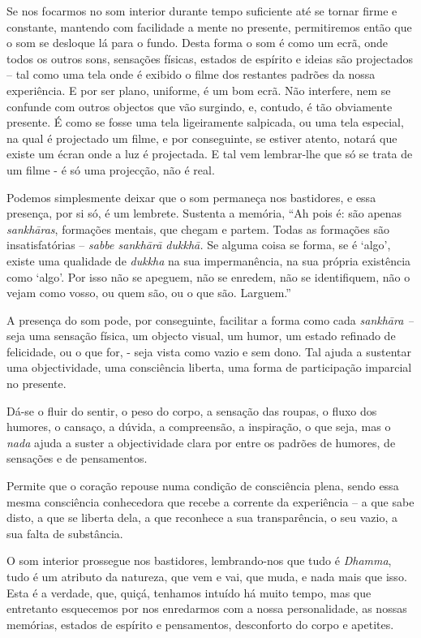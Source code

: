 Se nos focarmos no som interior durante tempo suficiente até se tornar
firme e constante, mantendo com facilidade a mente no presente,
permitiremos então que o som se desloque lá para o fundo. Desta forma o
som é como um ecrã, onde todos os outros sons, sensações físicas,
estados de espírito e ideias são projectados -- tal como uma tela onde é
exibido o filme dos restantes padrões da nossa experiência. E por ser
plano, uniforme, é um bom ecrã. Não interfere, nem se confunde com
outros objectos que vão surgindo, e, contudo, é tão obviamente presente.
É como se fosse uma tela ligeiramente salpicada, ou uma tela especial,
na qual é projectado um filme, e por conseguinte, se estiver atento,
notará que existe um écran onde a luz é projectada. E tal vem
lembrar-lhe que só se trata de um filme - é só uma projecção, não é
real.

Podemos simplesmente deixar que o som permaneça nos bastidores, e essa
presença, por si só, é um lembrete. Sustenta a memória, ``Ah pois é: são
apenas \emph{sankhāras}, formações mentais, que chegam e partem. Todas
as formações são insatisfatórias -- \emph{sabbe sankhārā dukkhā.} Se
alguma coisa se forma, se é `algo', existe uma qualidade de
\emph{dukkha} na sua impermanência, na sua própria existência como
`algo'. Por isso não se apeguem, não se enredem, não se identifiquem,
não o vejam como vosso, ou quem são, ou o que são. Larguem.''

A presença do som pode, por conseguinte, facilitar a forma como cada
\emph{sankhāra --} seja uma sensação física, um objecto visual, um
humor, um estado refinado de felicidade, ou o que for, - seja vista como
vazio e sem dono. Tal ajuda a sustentar uma objectividade, uma
consciência liberta, uma forma de participação imparcial no presente.

Dá-se o fluir do sentir, o peso do corpo, a sensação das roupas, o fluxo
dos humores, o cansaço, a dúvida, a compreensão, a inspiração, o que
seja, mas o \emph{nada} ajuda a suster a objectividade clara por entre
os padrões de humores, de sensações e de pensamentos.

Permite que o coração repouse numa condição de consciência plena, sendo
essa mesma consciência conhecedora que recebe a corrente da experiência
-- a que sabe disto, a que se liberta dela, a que reconhece a sua
transparência, o seu vazio, a sua falta de substância.

O som interior prossegue nos bastidores, lembrando-nos que tudo é
\emph{Dhamma}, tudo é um atributo da natureza, que vem e vai, que muda,
e nada mais que isso. Esta é a verdade, que, quiçá, tenhamos intuído há
muito tempo, mas que entretanto esquecemos por nos enredarmos com a
nossa personalidade, as nossas memórias, estados de espírito e
pensamentos, desconforto do corpo e apetites.

